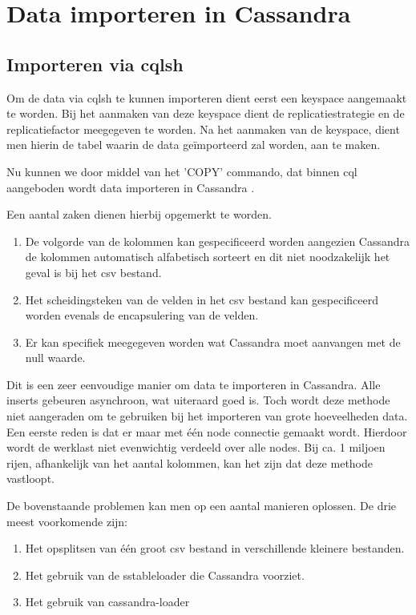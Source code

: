 \chapter{Data importeren in Cassandra}
\label{ch:cassandra_import}

\section{Importeren via cqlsh}
Om de data via cqlsh te kunnen importeren dient eerst een keyspace aangemaakt te worden.
Bij het aanmaken van deze keyspace dient de replicatiestrategie en de replicatiefactor meegegeven te worden.
Na het aanmaken van de keyspace, dient men hierin de tabel waarin de data geïmporteerd zal worden, aan te maken.

Nu kunnen we door middel van het 'COPY' commando, dat binnen cql aangeboden wordt data importeren in Cassandra \citep{Cannon2012Import}.

Een aantal zaken dienen hierbij opgemerkt te worden.

\begin{enumerate}
	\item De volgorde van de kolommen kan gespecificeerd worden aangezien Cassandra de kolommen automatisch alfabetisch sorteert en dit niet noodzakelijk het geval is bij het csv bestand.
	\item Het scheidingsteken van de velden in het csv bestand kan gespecificeerd worden evenals de encapsulering van de velden.
	\item Er kan specifiek meegegeven worden wat Cassandra moet aanvangen met de null waarde.
\end{enumerate}

Dit is een zeer eenvoudige manier om data te importeren in Cassandra.
Alle inserts gebeuren asynchroon, wat uiteraard goed is.
Toch wordt deze methode niet aangeraden om te gebruiken bij het importeren van grote hoeveelheden data.
Een eerste reden is dat er maar met één node connectie gemaakt wordt.
Hierdoor wordt de werklast niet evenwichtig verdeeld over alle nodes.
Bij ca. 1 miljoen rijen, afhankelijk van het aantal kolommen, kan het zijn dat deze methode vastloopt.

De bovenstaande problemen kan men op een aantal manieren oplossen.
De drie meest voorkomende zijn:

\begin{enumerate}
	\item Het opsplitsen van één groot csv bestand in verschillende kleinere bestanden.
	\item Het gebruik van de sstableloader die Cassandra voorziet.
	\item Het gebruik van cassandra-loader
\end{enumerate}

